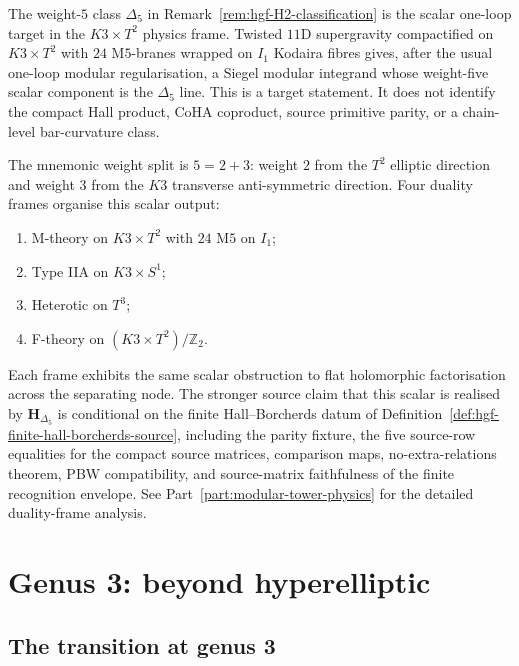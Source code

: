 \begin{remark}
\label{rem:hgf-sugra-delta5}
The weight-$5$ class $\Delta_5$ in
Remark~\ref{rem:hgf-H2-classification} is the scalar one-loop target
in the $K3\times T^2$ physics frame. Twisted $11$D supergravity
compactified on $K3 \times T^2$ with $24$ M$5$-branes wrapped on
$I_1$ Kodaira fibres gives, after the usual one-loop modular
regularisation, a Siegel modular integrand whose weight-five scalar
component is the $\Delta_5$ line. This is a target statement. It does
not identify the compact Hall product, CoHA coproduct, source
primitive parity, or a chain-level bar-curvature class.

The mnemonic weight split is $5=2+3$: weight $2$ from the $T^2$
elliptic direction and weight $3$ from the $K3$ transverse
anti-symmetric direction. Four duality frames organise this scalar
output:
\begin{enumerate}[label=\textup{(\roman*)}]
\item M-theory on $K3 \times T^2$ with $24$ M$5$ on $I_1$;
\item Type IIA on $K3 \times S^1$;
\item Heterotic on $T^3$;
\item F-theory on $(K3 \times T^2)/\mathbb{Z}_2$.
\end{enumerate}
Each frame exhibits the same scalar obstruction to flat holomorphic
factorisation across the separating node. The stronger source claim
that this scalar is realised by $\mathbf H_{\Delta_5}$ is conditional
on the finite Hall--Borcherds datum of
Definition~\ref{def:hgf-finite-hall-borcherds-source}, including the
parity fixture, the five source-row equalities for the compact source
matrices, comparison maps, no-extra-relations theorem, PBW
compatibility, and source-matrix faithfulness of the finite recognition
envelope. See
Part~\ref{part:modular-tower-physics} for the detailed duality-frame analysis.
\end{remark}

\section{Genus 3: beyond hyperelliptic}
\label{sec:genus-3-complete}

\subsection{The transition at genus 3}

